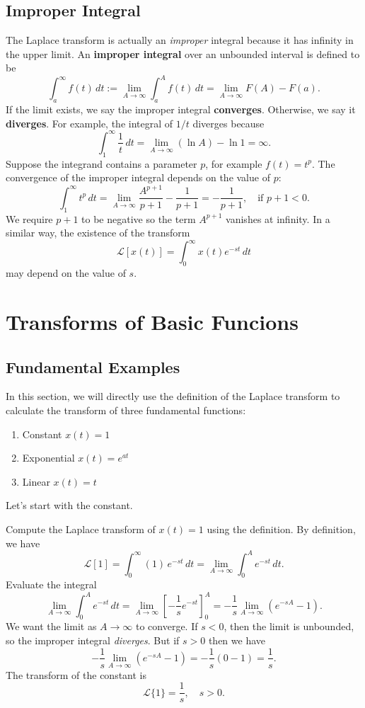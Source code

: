 \documentclass[10pt,letterpaper]{article}
\begin{document}
\subsection{Improper Integral} 
The Laplace transform is actually an \textit{improper} integral because it has infinity in the upper limit. An \textbf{improper integral} over an unbounded interval is defined to be
$$
\int_a^\infty f(t)\,dt := \lim_{A \to \infty} \int_a^A f(t)\,dt =\lim_{A\to\infty}F(A)-F(a).
$$
If the limit exists, we say the improper integral \textbf{converges}. Otherwise, we say it \textbf{diverges}. For example, the integral of $1/t$ diverges because
$$
    \int_1^\infty \frac1t\,dt = \lim_{A\to\infty} (\ln A) - \ln1 = \infty.
$$
Suppose the integrand contains a parameter $p$, for example $f(t) = t^p$. The convergence of the improper integral depends on the value of $p$:
$$
    \int_1^\infty t^p\,dt = \lim_{A\to\infty} \frac{A^{p+1}}{p+1} - \frac{1}{p+1} = -\frac{1}{p+1}, \quad \text{if } p+1<0.
$$
We require $p+1$ to be negative so the term $A^{p+1}$ vanishes at infinity.
In a similar way, the existence of the transform 
$$
\mathcal{L}[x(t)] =  \int_0^\infty x(t)e^{-st}\,dt
$$
may depend on the value of $s$.

\section{Transforms of Basic Funcions}

\subsection{Fundamental Examples}
In this section, we will directly use the definition of the Laplace transform to calculate the transform of three fundamental functions:
\begin{enumerate}
    \item Constant $x(t)=1$
    \item Exponential $x(t)=e^{at}$
    \item Linear $x(t)=t$
\end{enumerate}
Let's start with the constant.

\begin{example}[1]{
Compute the Laplace transform of $x(t)=1$ using the definition.
}
 By definition, we have
\[
\mathcal{L}[1] =\int_0^\infty (1)\,e^{-st}\,dt = \lim_{A\to\infty} \int_0^A e^{-st}\,dt.
\]
Evaluate the integral 
\[
\lim_{A\to\infty} \int_0^A e^{-st}\,dt= \lim_{A\to\infty} \left[-\frac{1}{s}e^{-st}\right]_0^A=-\frac{1}{s}\lim_{A\to\infty}(e^{-sA}-1).
\]
We want the limit as $A\to\infty$ to converge.
If $s<0$, then the limit is unbounded, so the improper integral \textit{diverges}. But if $s>0$ then we have 
\[
-\frac{1}{s}\lim_{A\to\infty}(e^{-sA}-1) = -\frac{1}{s}(0-1)= \frac1s.
\]
The transform of the constant is
\[
\boxed{\mathcal{L}\{1\}=\frac{1}{s},\quad s>0.}
\]
\end{example}
\end{document}
